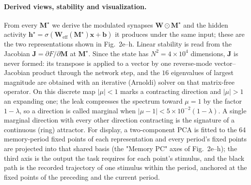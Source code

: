 \documentclass{article}
\begin{document}
\paragraph{Derived views, stability and visualization.}
From every $\mathbf{M}^\star$ we derive the modulated synapses $\mathbf{W}\odot\mathbf{M}^\star$ and the hidden activity $\mathbf{h}^\star = \sigma(\mathbf{W}_{\text{eff}}(\mathbf{M}^\star)\mathbf{x} + \mathbf{b})$ it produces under the same input; these are the two representations shown in Fig.~2e--h. Linear stability is read from the Jacobian $\mathbf{J} = \partial F/\partial \mathbf{M}$ at $\mathbf{M}^\star$. Since the state has $N^2 = 4\times10^4$ dimensions, $\mathbf{J}$ is never formed: its transpose is applied to a vector by one reverse-mode vector--Jacobian product through the network step, and the $16$ eigenvalues of largest magnitude are obtained with an iterative (Arnoldi) solver on that matrix-free operator. On this discrete map $|\mu| < 1$ marks a contracting direction and $|\mu| > 1$ an expanding one; the leak compresses the spectrum toward $\mu = 1$ by the factor $1-\lambda$, so a direction is called marginal when $|\mu - 1| < 5\times10^{-2}(1-\lambda)$. A single marginal direction with every other direction contracting is the signature of a continuous (ring) attractor. For display, a two-component PCA is fitted to the 64 memory-period fixed points of each representation and every period's fixed points are projected into that shared basis (the "Memory PC" axes of Fig.~2e--h); the third axis is the output the task requires for each point's stimulus, and the black path is the recorded trajectory of one stimulus within the period, anchored at the fixed points of the preceding and the current period.

\printbibliography %
\end{document}
